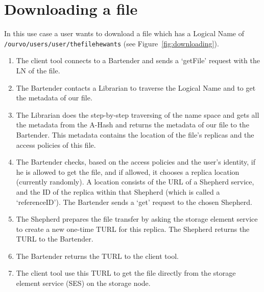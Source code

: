 \documentclass{book}
\begin{document}

\section{Downloading a file} %
\label{sec:downloading_a_file}
\begin{figure}[ht]
\end{figure}

In this use case a user wants to download a file which has a Logical Name of \verb#/ourvo/users/user/thefilehewants# (see Figure~\ref{fig:downloading}).

\begin{enumerate}
    \item The client tool connects to a Bartender and sends a `getFile' request with the LN of the file.
    \item The Bartender contacts a Librarian to traverse the Logical Name and to get the metadata of our file.
    \item The Librarian does the step-by-step traversing of the name space and gets all the metadata from the A-Hash and returns the metadata of our file to the Bartender. This metadata contains the location of the file's replicas and the access policies of this file.
    \item The Bartender checks, based on the access policies and the user's identity, if he is allowed to get the file, and if allowed, it chooses a replica location (currently randomly). A location consists of the URL of a Shepherd service, and the ID of the replica within that Shepherd (which is called a `referenceID'). The Bartender sends a `get' request to the chosen Shepherd.
    \item The Shepherd prepares the file transfer by asking the storage element service to create a new one-time TURL for this replica. The Shepherd returns the TURL to the Bartender.
    \item The Bartender returns the TURL to the client tool.
    \item The client tool use this TURL to get the file directly from the storage element service (SES) on the storage node.
\end{enumerate}
\end{document}
